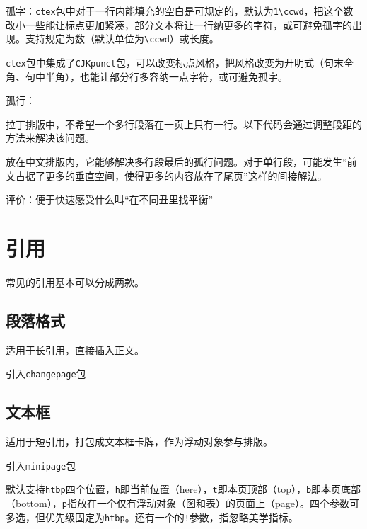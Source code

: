 \documentclass[10pt,openany]{book}
\begin{document}
孤字：\texttt{ctex}包中对于一行内能填充的空白是可规定的，默认为\texttt{1\textbackslash{}ccwd}，把这个数改小一些能让标点更加紧凑，部分文本将让一行纳更多的字符，或可避免孤字的出现。支持规定为数（默认单位为\texttt{\textbackslash{}ccwd}）或长度。



\texttt{ctex}包中集成了\texttt{CJKpunct}包，可以改变标点风格，把风格改变为开明式（句末全角、句中半角），也能让部分行多容纳一点字符，或可避免孤字。



孤行：

拉丁排版中，不希望一个多行段落在一页上只有一行。以下代码会通过调整段距的方法来解决该问题。



放在中文排版内，它能够解决多行段最后的孤行问题。对于单行段，可能发生“前文占据了更多的垂直空间，使得更多的内容放在了尾页”这样的间接解法。

评价：便于快速感受什么叫“在不同丑里找平衡”

\chapter{引用}

常见的引用基本可以分成两款。

\section{段落格式}

适用于长引用，直接插入正文。

引入\texttt{changepage}包



\section{文本框}

适用于短引用，打包成文本框卡牌，作为浮动对象参与排版。

引入\texttt{minipage}包



默认支持\texttt{htbp}四个位置，\texttt{h}即当前位置（here），\texttt{t}即本页顶部（top），\texttt{b}即本页底部（bottom），\texttt{p}指放在一个仅有浮动对象（图和表）的页面上（page）。四个参数可多选，但优先级固定为\texttt{htbp}。还有一个的\texttt{!}参数，指忽略美学指标。
\end{document}
